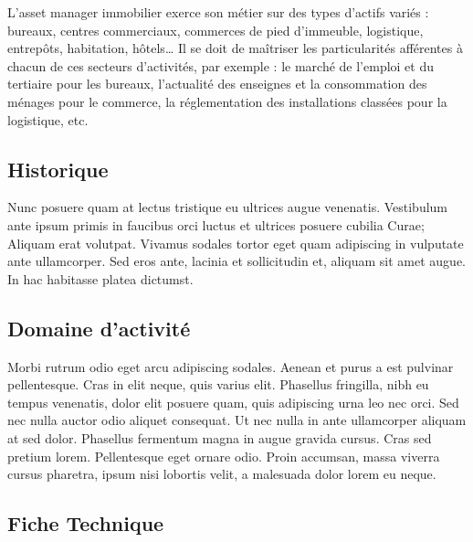 \par L’asset manager immobilier exerce son métier sur des types d'actifs variés : bureaux, centres commerciaux, commerces de pied d'immeuble, logistique, entrepôts, habitation, hôtels… Il se doit de maîtriser les particularités afférentes à chacun de ces secteurs d'activités, par exemple : le marché de l'emploi et du tertiaire pour les bureaux, l'actualité des enseignes et la consommation des ménages pour le commerce, la réglementation des installations classées pour la logistique, etc.

\subsection{Historique}

Nunc posuere quam at lectus tristique eu ultrices augue venenatis. Vestibulum ante ipsum primis in faucibus orci luctus et ultrices posuere cubilia Curae; Aliquam erat volutpat. Vivamus sodales tortor eget quam adipiscing in vulputate ante ullamcorper. Sed eros ante, lacinia et sollicitudin et, aliquam sit amet augue. In hac habitasse platea dictumst.


\subsection{Domaine d'activité}
Morbi rutrum odio eget arcu adipiscing sodales. Aenean et purus a est pulvinar pellentesque. Cras in elit neque, quis varius elit. Phasellus fringilla, nibh eu tempus venenatis, dolor elit posuere quam, quis adipiscing urna leo nec orci. Sed nec nulla auctor odio aliquet consequat. Ut nec nulla in ante ullamcorper aliquam at sed dolor. Phasellus fermentum magna in augue gravida cursus. Cras sed pretium lorem. Pellentesque eget ornare odio. Proin accumsan, massa viverra cursus pharetra, ipsum nisi lobortis velit, a malesuada dolor lorem eu neque.



\subsection{Fiche Technique}

